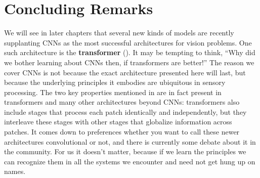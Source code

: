 








\section{Concluding Remarks}
We will see in later chapters that several new kinds of models are recently supplanting CNNs as the most successful architectures for vision problems. One such architecture is the \textbf{transformer} (\chap{\ref{chapter:transformers}}). It may be tempting to think, ``Why did we bother learning about CNNs then, if transformers are better!'' The reason we cover CNNs is not because the exact architecture presented here will last, but because the underlying principles it embodies are ubiquitous in sensory processing. The two key properties mentioned in \sect{\ref{sec:convolutional_neural_nets:key_properties}} are in fact present in transformers and many other architectures beyond CNNs: transformers also include stages that process each patch identically and independently, but they interleave these stages with other stages that globalize information across patches. It comes down to preferences whether you want to call these newer architectures convolutional or not, and there is currently some debate about it in the community. For us it doesn't matter, because if we learn the principles we can recognize them in all the systems we encounter and need not get hung up on names.

